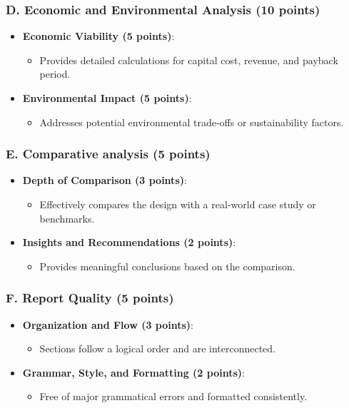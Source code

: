 \documentclass[11pt]{article}
\begin{document}
\subsubsection*{D. Economic and Environmental Analysis (10 points)}
\begin{itemize}
    \item \textbf{Economic Viability (5 points)}:
    \begin{itemize}
        \item Provides detailed calculations for capital cost, revenue, and payback period.
    \end{itemize}
    \item \textbf{Environmental Impact (5 points)}:
    \begin{itemize}
        \item Addresses potential environmental trade-offs or sustainability factors.
    \end{itemize}
\end{itemize}

\subsubsection*{E. Comparative analysis (5 points)}
\begin{itemize}
    \item \textbf{Depth of Comparison (3 points)}:
    \begin{itemize}
        \item Effectively compares the design with a real-world case study or benchmarks.
    \end{itemize}
    \item \textbf{Insights and Recommendations (2 points)}:
    \begin{itemize}
        \item Provides meaningful conclusions based on the comparison.
    \end{itemize}
\end{itemize}

\subsubsection*{F. Report Quality (5 points)}
\begin{itemize}
    \item \textbf{Organization and Flow (3 points)}:
    \begin{itemize}
        \item Sections follow a logical order and are interconnected.
    \end{itemize}
    \item \textbf{Grammar, Style, and Formatting (2 points)}:
    \begin{itemize}
        \item Free of major grammatical errors and formatted consistently.
    \end{itemize}
\end{itemize}
\end{document}
